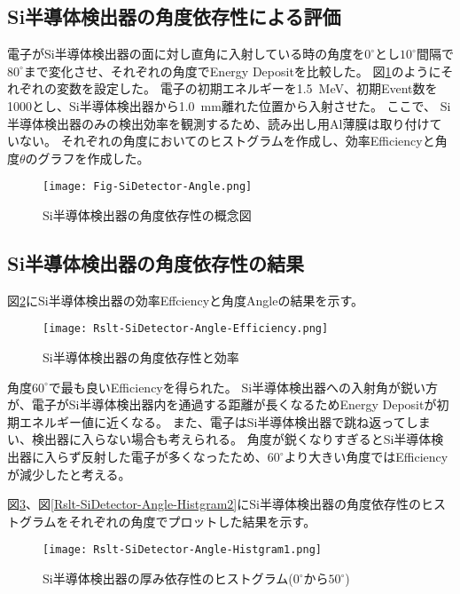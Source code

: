\documentclass[a4paper,10pt]{jreport}
\begin{document}
\subsection{Si半導体検出器の角度依存性による評価}

電子がSi半導体検出器の面に対し直角に入射している時の角度を$0^{\circ}$とし$10^{\circ}$間隔で$80^{\circ}$まで変化させ、それぞれの角度でEnergy Depositを比較した。
 図\ref{Fig-SiDetector-Angle}のようにそれぞれの変数を設定した。
電子の初期エネルギーを\SI{1.5}{MeV}、初期Event数を1000とし、Si半導体検出器から\SI{1.0}{mm}離れた位置から入射させた。
ここで、 Si半導体検出器のみの検出効率を観測するため、読み出し用Al薄膜は取り付けていない。
それぞれの角度においてのヒストグラムを作成し、効率Efficiencyと角度$\theta$のグラフを作成した。

\begin{figure}[H]
	\center
	\texttt{[image: Fig-SiDetector-Angle.png]}
	\caption{Si半導体検出器の角度依存性の概念図} \label{Fig-SiDetector-Angle}
\end{figure}



\subsection{Si半導体検出器の角度依存性の結果}

図\ref{Rslt-SiDetector-Angle-Efficiency}にSi半導体検出器の効率Effciencyと角度Angleの結果を示す。
	
\begin{figure}[H]
	\center
	\texttt{[image: Rslt-SiDetector-Angle-Efficiency.png]}
	\caption{Si半導体検出器の角度依存性と効率} \label{Rslt-SiDetector-Angle-Efficiency}
\end{figure}

角度$60^{\circ}$で最も良いEfficiencyを得られた。
Si半導体検出器への入射角が鋭い方が、電子がSi半導体検出器内を通過する距離が長くなるためEnergy Depositが初期エネルギー値に近くなる。
また、電子はSi半導体検出器で跳ね返ってしまい、検出器に入らない場合も考えられる。
角度が鋭くなりすぎるとSi半導体検出器に入らず反射した電子が多くなったため、$60^{\circ}$より大きい角度ではEfficiencyが減少したと考える。

図\ref{Rslt-SiDetector-Angle-Histgram1}、図\ref{Rslt-SiDetector-Angle-Histgram2}にSi半導体検出器の角度依存性のヒストグラムをそれぞれの角度でプロットした結果を示す。

\begin{figure}[H]
	\center
	\texttt{[image: Rslt-SiDetector-Angle-Histgram1.png]}
	\caption{Si半導体検出器の厚み依存性のヒストグラム($0^{\circ}$から$50^{\circ}$)} \label{Rslt-SiDetector-Angle-Histgram1}
\end{figure}
\end{document}
